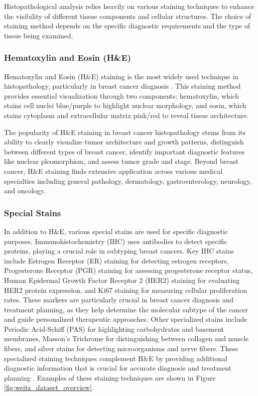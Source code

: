 Histopathological analysis relies heavily on various staining
techniques to enhance the visibility of different tissue components
and cellular structures. The choice of staining method depends on the
specific diagnostic requirements and the type of tissue being examined.

\subsubsection{Hematoxylin and Eosin (H\&E)}

Hematoxylin and Eosin (H\&E) staining is the most widely used
technique in histopathology, particularly in breast cancer diagnosis
\cite{PanEtAl2021}. This staining method provides essential visualization
through two components: hematoxylin, which stains cell nuclei
blue/purple to highlight nuclear morphology, and eosin, which stains
cytoplasm and extracellular matrix pink/red to reveal tissue architecture.

The popularity of H\&E staining in breast cancer histopathology stems
from its ability to clearly visualize tumor architecture and growth
patterns, distinguish between different types of breast cancer,
identify important diagnostic features like nuclear pleomorphism, and
assess tumor grade and stage. Beyond breast cancer, H\&E staining
finds extensive application across various medical specialties
including general pathology, dermatology, gastroenterology,
neurology, and oncology.

\subsubsection{Special Stains}

In addition to H\&E, various special stains are used for specific
diagnostic purposes. Immunohistochemistry (IHC) uses antibodies to
detect specific proteins, playing a crucial role in subtyping breast
cancers. Key IHC stains include Estrogen Receptor (ER) staining for detecting
estrogen receptors, Progesterone Receptor (PGR) staining for assessing
progesterone receptor status, Human Epidermal Growth Factor Receptor 2
(HER2) staining for evaluating HER2 protein expression, and Ki67
staining for measuring cellular proliferation rates. These markers are
particularly crucial in breast cancer diagnosis and treatment planning,
as they help determine the molecular subtype of the cancer and guide
personalized therapeutic approaches. Other specialized stains include
Periodic Acid-Schiff (PAS) for highlighting carbohydrates and basement
membranes, Masson's Trichrome for distinguishing between collagen and
muscle fibers, and silver stains for detecting microorganisms and
nerve fibers. These specialized staining techniques complement H\&E
by providing additional diagnostic information that is crucial for
accurate diagnosis and treatment planning \cite{WeitzEtAl2023}.
Examples of these staining techniques are shown in Figure
\ref{fig:weitz_dataset_overview}.
